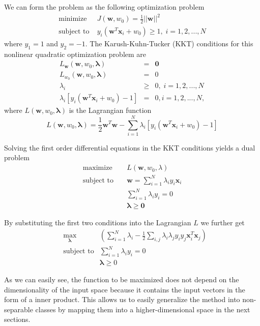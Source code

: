 We can form the problem as the following optimization problem
\begin{align}
\text{minimize} &\; J(\mathbf{w}, w_0) = \frac{1}{2} ||\mathbf{w}||^2 \\
\text{subject to} &\; y_i (\mathbf{w}^T \mathbf{x}_i + w_0) \ge 1, \; i = 1,2,...,N \label{eq:svm_linear_variables} 
\end{align}
where $y_1 = 1$ and $y_2 = -1$. The Karush-Kuhn-Tucker (KKT) conditions for this nonlinear quadratic optimization problem are
\begin{eqnarray} 
L_{\mathbf{w}}(\mathbf{w}, w_0, \mathbf{\lambda}) &=& \mathbf{0} \label{eq:KKT} \\
L_{w_0}(\mathbf{w}, w_0, \mathbf{\lambda}) &=& 0 \\
\lambda_i &\ge& 0, \; i = 1, 2, ..., N \\
\lambda_i [y_i (\mathbf{w}^T \mathbf{x}_i + w_0) - 1] &=& 0,
i = 1, 2, ..., N,
\end{eqnarray}
where $L(\mathbf{w}, w_0, \mathbf{\lambda})$ is the Lagrangian function
\begin{equation}
L(\mathbf{w}, w_0, \mathbf{\lambda}) = \frac{1}{2} \mathbf{w}^T \mathbf{w} - \sum_{i=1}^N \lambda_i [y_i (\mathbf{w}^T \mathbf{x}_i + w_0) - 1]
\end{equation}

Solving the first order differential equations in the KKT conditions yields a dual problem
\begin{eqnarray}
\text{maximize} &\;& L(\mathbf{w}, w_0, \lambda) \\
\text{subject to} &\;& \mathbf{w} = \sum_{i=1}^N \lambda_i y_i \mathbf{x}_i \\
&& \sum_{i=1}^N \lambda_i y_i = 0 \\
&& \mathbf{\lambda} \ge \mathbf{0}
\end{eqnarray}

By substituting the first two conditions into the Lagrangian $L$ we further get
\begin{eqnarray}
&\underset{\mathbf{\lambda}}{\operatorname{max}}& \left ( \sum_{i=1}^N \lambda_i - \frac{1}{2} \sum_{i, j} \lambda_i \lambda_j y_i y_j \mathbf{x}_i^T \mathbf{x}_j \right ) \label{eq:SVM_KKT_1} \\ 
&\text{subject to}& \sum_{i=1}^N \lambda_i y_i = 0 \label{eq:SVM_KKT_2} \\ 
&&\mathbf{\lambda} \ge 0 \label{eq:SVM_KKT_3}
\end{eqnarray}

As we can easily see, the function to be maximized does not depend on the dimensionality of the input space because it contains the input vectors in the form of a inner product. This allows us to easily generalize the method into non-separable classes by mapping them into a higher-dimensional space in the next sections.

